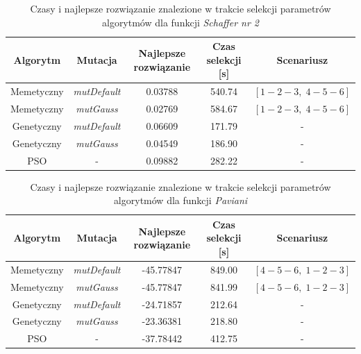 \begin{table}[ht]
\caption{Czasy i najlepsze rozwiązanie znalezione w trakcie selekcji parametrów algorytmów dla funkcji \emph{Schaffer nr 2}}
\label{table:selekcja_Schaffer_czasy}
\begin{center}
\begin{tabular}{|c|c|c|c|c|}
	\hline
	Algorytm & Mutacja & Najlepsze rozwiązanie & Czas selekcji [s] & Scenariusz \\
	\hline
	Memetyczny & \emph{mutDefault} & 0.03788 & 540.74 & $[1-2-3,\; 4-5-6]$\\
	Memetyczny & \emph{mutGauss} & 0.02769 & 584.67 & $[1-2-3,\; 4-5-6]$ \\
	Genetyczny & \emph{mutDefault} & 0.06609 & 171.79 & - \\
	Genetyczny & \emph{mutGauss} & 0.04549 & 186.90 & - \\
	PSO	& - & 0.09882 & 282.22 & -\\

	\hline
	\end{tabular}
\end{center}
\end{table}            

\begin{table}[ht]
\caption{Czasy i najlepsze rozwiązanie znalezione w trakcie selekcji parametrów algorytmów dla funkcji \emph{Paviani}}
\label{table:selekcja_Paviani_czasy}
\begin{center}
\begin{tabular}{|c|c|c|c|c|}
	\hline
	Algorytm & Mutacja & Najlepsze rozwiązanie & Czas selekcji [s] & Scenariusz \\
	\hline
	Memetyczny & \emph{mutDefault} & -45.77847 & 849.00 & $[4-5-6,\; 1-2-3]$\\
	Memetyczny & \emph{mutGauss} & -45.77847 & 841.99 & $[4-5-6,\; 1-2-3]$ \\
	Genetyczny & \emph{mutDefault} & -24.71857 & 212.64 & - \\
	Genetyczny & \emph{mutGauss} & -23.36381 & 218.80 & - \\
	PSO	& - & -37.78442 & 412.75 & -\\

	\hline
	\end{tabular}
\end{center}
\end{table}




